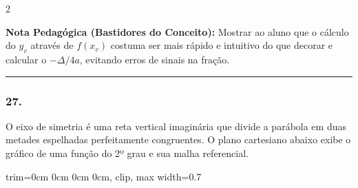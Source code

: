 \begin{multicols*}{2}
    \begin{boxexplicacao}
    \textbf{Nota Pedagógica (Bastidores do Conceito):} Mostrar ao aluno que o cálculo do $y_v$ através de $f(x_v)$ costuma ser mais rápido e intuitivo do que decorar e calcular o $-\Delta/4a$, evitando erros de sinais na fração.
    \end{boxexplicacao}
\fi

\par\vspace{\espacoQuestao}

\noindent\textcolor{CorLinha}{\rule{\linewidth}{0.5pt}} 
\par\vspace{\espacoPreQuestao}
\subsubsection*{27.} 
\begin{enunciadoLiteral}
O eixo de simetria é uma reta vertical imaginária que divide a parábola em duas metades espelhadas perfeitamente congruentes. O plano cartesiano abaixo exibe o gráfico de uma função do 2º grau e sua malha referencial.

\begin{center}
\begin{adjustbox}{trim=0cm 0cm 0cm 0cm, clip, max width=0.7\linewidth}
\end{adjustbox}
\end{center}
\end{enunciadoLiteral}
\end{multicols*}
